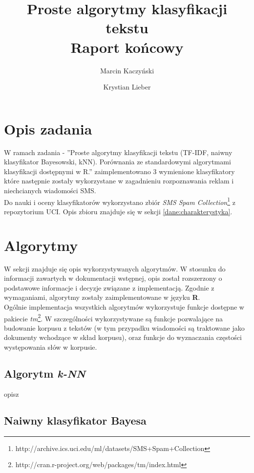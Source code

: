 \documentclass[a4paper,12pt]{article}
\title{Proste algorytmy klasyfikacji tekstu \\ Raport końcowy}
\author{Marcin Kaczyński \and Krystian Lieber}
\begin{document}
\maketitle

\section{Opis zadania} 

W ramach zadania - ''Proste algorytmy klasyfikacji tekstu (TF-IDF, naiwny klasyfikator Bayesowski, kNN). Porównania ze standardowymi algorytmami klasyfikacji dostępnymi w R.'' zaimplementowano 3 wymienione klasyfikatory które następnie zostały wykorzystane w zagadnieniu rozpoznawania reklam i niechcianych wiadomości SMS.\\

Do nauki i oceny klasyfikatorów wykorzystano zbiór \textit{SMS Spam Collection}\footnote{http://archive.ics.uci.edu/ml/datasets/SMS+Spam+Collection} z repozytorium UCI. Opis zbioru znajduje się w sekcji \ref{dane:charakterystyka}.

\section{Algorytmy}

W sekcji znajduje się opis wykorzystywanych algorytmów. W stosunku do informacji zawartych w dokumentacji wstępnej, opis został rozszerzony o 
podstawowe informacje i decyzje związane z implementacją. Zgodnie z wymaganiami, algorytmy zostały zaimplementowane w języku \textbf{R}.\\

Ogólnie implementacja wszystkich algorytmów wykorzystuje funkcje dostępne w pakiecie \textit{tm}\footnote{http://cran.r-project.org/web/packages/tm/index.html}. W szczególności wykorzystywane są funkcje pozwalające na budowanie korpusu z tekstów (w tym przypadku wiadomości są traktowane jako dokumenty wchodzące w skład korpusu), oraz funkcje do wyznaczania częstości występowania słów w korpusie.

\subsection{Algorytm \textit{k-NN}}

opisz

\subsection{Naiwny klasyfikator Bayesa}
\end{document}
